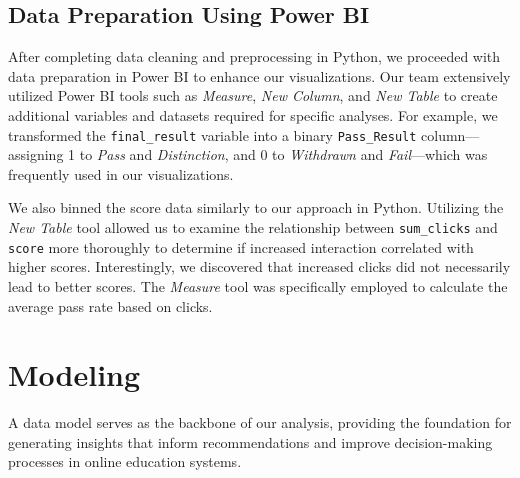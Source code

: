 \subsection*{Data Preparation Using Power BI}

After completing data cleaning and preprocessing in Python, we proceeded with data preparation in Power BI to enhance our visualizations. Our team extensively utilized Power BI tools such as \textit{Measure}, \textit{New Column}, and \textit{New Table} to create additional variables and datasets required for specific analyses. For example, we transformed the \texttt{final\_result} variable into a binary \texttt{Pass\_Result} column—assigning 1 to \textit{Pass} and \textit{Distinction}, and 0 to \textit{Withdrawn} and \textit{Fail}—which was frequently used in our visualizations.

We also binned the score data similarly to our approach in Python. Utilizing the \textit{New Table} tool allowed us to examine the relationship between \texttt{sum\_clicks} and \texttt{score} more thoroughly to determine if increased interaction correlated with higher scores. Interestingly, we discovered that increased clicks did not necessarily lead to better scores. The \textit{Measure} tool was specifically employed to calculate the average pass rate based on clicks.

\section{Modeling}
A data model serves as the backbone of our analysis, providing the foundation for generating insights that inform recommendations and improve decision-making processes in online education systems.
